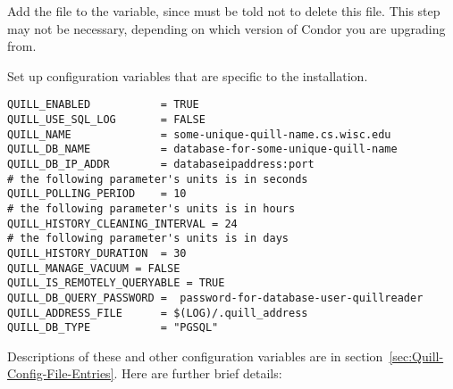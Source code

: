 \begin{description}
\item Add the file  to the 
   variable, since  must
  be told not to delete this file.
  This step may not be necessary, depending on which version of Condor 
  you are upgrading from. 
 
\item Set up configuration variables that are specific
  to the installation.
\footnotesize
\begin{verbatim}
QUILL_ENABLED           = TRUE
QUILL_USE_SQL_LOG		= FALSE
QUILL_NAME              = some-unique-quill-name.cs.wisc.edu
QUILL_DB_NAME           = database-for-some-unique-quill-name
QUILL_DB_IP_ADDR        = databaseipaddress:port
# the following parameter's units is in seconds
QUILL_POLLING_PERIOD    = 10
# the following parameter's units is in hours
QUILL_HISTORY_CLEANING_INTERVAL = 24
# the following parameter's units is in days
QUILL_HISTORY_DURATION 	= 30
QUILL_MANAGE_VACUUM = FALSE
QUILL_IS_REMOTELY_QUERYABLE = TRUE
QUILL_DB_QUERY_PASSWORD =  password-for-database-user-quillreader
QUILL_ADDRESS_FILE      = $(LOG)/.quill_address
QUILL_DB_TYPE			= "PGSQL"

\end{verbatim}
\normalsize

\end{description}


Descriptions of these and other configuration variables are in
section~\ref{sec:Quill-Config-File-Entries}.
Here are further brief details:

